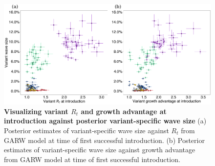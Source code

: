 \documentclass[11pt,oneside,letterpaper]{article}
\def\tbc#1{\textcolor{purple}{[#1]}}
\def\mfc#1{\textcolor{brown}{[#1]}}
\begin{document}

\begin{figure}[h!]
  \centering
  \includegraphics[width=\linewidth]{figs/intro_R_to_wave_size.png}
  \caption{\textbf{Visualizing variant $R_{t}$ and growth advantage at introduction against posterior variant-specific wave size}
      (a) Posterior estimates of variant-specific wave size against $R_{t}$ from GARW model at time of first successful introduction.
      (b) Posterior estimates of variant-specific wave size against growth advantage from GARW model at time of first successful introduction.
  }
  \label{fig:intro_R_to_wave_size}
\end{figure}
\end{document}

